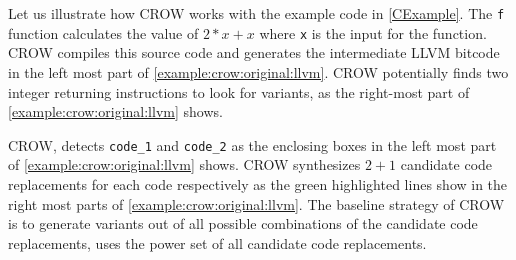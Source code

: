 \label{section:crow:example}

Let us illustrate how CROW works with the example code in \autoref{CExample}. The \texttt{f} function calculates the value of $2 * x + x$ where \texttt{x} is the input for the function.  CROW compiles this source code and generates the intermediate LLVM bitcode in the left most part of \autoref{example:crow:original:llvm}. CROW potentially finds two integer returning instructions to look for variants, as the right-most part of \autoref{example:crow:original:llvm} shows.


    

CROW, detects \texttt{code\_1} and \texttt{code\_2} as the enclosing boxes in the left most part of \autoref{example:crow:original:llvm} shows. CROW synthesizes $2 + 1$ candidate code replacements for each code respectively as the green highlighted lines show in the right most parts of \autoref{example:crow:original:llvm}.
The baseline strategy of CROW is to generate variants out of all possible combinations of the candidate code replacements, \ie uses the power set of all candidate code replacements.


